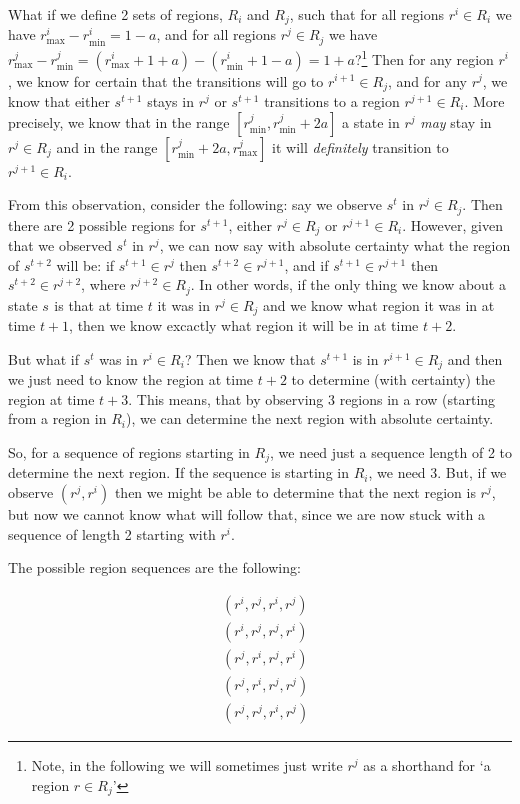\documentclass[a4paper]{article}
\newcommand \rmin[1][]      {\ensuremath {r^{#1}_{\min}}\xspace}
\newcommand \rmax[1][]      {\ensuremath {r^{#1}_{\max}}\xspace}
\newcommand \state[1][]     {\ensuremath {s^{#1}}\xspace}
\newcommand \currstate      {\ensuremath {\state[t]}\xspace}
\newcommand \nextstate      {\ensuremath {\state[t+1]}\xspace}
\begin{document}
What if we define 2 sets of regions, $R_i$ and $R_j$, such that for all regions
$r^i \in R_i$ we have $\rmax[i] - \rmin[i] = 1-a$, and for all regions $r^j \in
R_j$ we have $\rmax[j] - \rmin[j] = (\rmax[i] + 1 + a) - (\rmin[i] + 1 - a) = 1
+ a$?\footnote{Note, in the following we will sometimes just write $r^j$ as a
shorthand for `a region $r \in R_j$'} Then for any region $r^i$, we know for
certain that the transitions will go to $r^{i+1} \in R_j$, and for any $r^j$, we
know that either $s^{t+1}$ stays in $r^j$ or $s^{t+1}$ transitions to a region
$r^{j+1} \in R_i$. More precisely, we know that in the range $[\rmin[j],
\rmin[j] + 2a]$ a state in $r^{j}$ \textit{may} stay in $r^j \in R_j$ and in the
range $[\rmin[j] + 2a, \rmax[j]]$ it will \textit{definitely} transition to
$r^{j+1} \in R_i$.

From this observation, consider the following: say we observe $\currstate$ in
$r^j \in R_j$. Then there are 2 possible regions for $\nextstate$, either $r^j
\in R_j$ or $r^{j+1} \in R_i$. However, given that we observed $\currstate$ in
$r^j$, we can now say with absolute certainty what the region of $\state[t+2]$
will be: if $\nextstate \in r^j$ then $\state[t+2] \in r^{j+1}$, and if
$\nextstate \in r^{j+1}$ then $\state[t+2] \in r^{j+2}$, where $r^{j+2} \in
R_j$. In other words, if the only thing we know about a state $\state$ is that
at time $t$ it was in $r^j \in R_j$ and we know what region it was in at time
$t+1$, then we know excactly what region it will be in at time $t+2$.

But what if $\currstate$ was in $r^i \in R_i$? Then we know that $\nextstate$ is
in $r^{i+1} \in R_j$ and then we just need to know the region at time $t+2$ to
determine (with certainty) the region at time $t+3$. This means, that by
observing 3 regions in a row (starting from a region in $R_i$), we can determine
the next region with absolute certainty. 

So, for a sequence of regions starting in $R_j$, we need just a sequence length
of 2 to determine the next region. If the sequence is starting in $R_i$, we need
3. But, if we observe $(r^j, r^i)$ then we might be able to determine that the
next region is $r^j$, but now we cannot know what will follow that, since we are
now stuck with a sequence of length 2 starting with $r^i$.

The possible region sequences are the following:

\begin{align*}
    &(r^i, r^j, r^i, r^j) \\
    &(r^i, r^j, r^j, r^i) \\
    &(r^j, r^i, r^j, r^i) \\
    &(r^j, r^i, r^j, r^j) \\
    &(r^j, r^j, r^i, r^j)
\end{align*}
\end{document}

